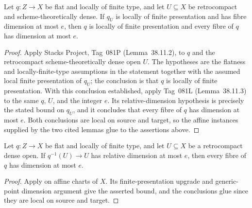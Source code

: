 \begin{lemma}
  \label{lemma:nagata-dense-open-dimension-package}

  Let $q\colon Z\to X$ be flat and locally of finite type, and let $U\subseteq X$
  be retrocompact and scheme-theoretically dense.  If $q_U$ is locally of
  finite presentation and has fibre dimension at most $e$, then $q$ is locally
  of finite presentation and every fibre of $q$ has dimension at most $e$.
\end{lemma}

\begin{proof}
  Apply Stacks Project, Tag~081P (Lemma~38.11.2), to $q$ and the
  retrocompact scheme-theoretically dense open $U$.  The hypotheses are the
  flatness and locally-finite-type assumptions in the statement together with
  the assumed local finite presentation of $q_U$; the conclusion is that $q$
  is locally of finite presentation.  With this conclusion established,
  apply Tag~081L (Lemma~38.11.3) to the same $q$, $U$, and the integer $e$.
  Its relative-dimension hypothesis is precisely the stated bound on
  $q_U$, and it concludes that every fibre of $q$ has dimension at most $e$.
  Both conclusions are local on source and target, so the affine instances
  supplied by the two cited lemmas glue to the assertions above.
\end{proof}

\begin{lemma}
  \label{lemma:nagata-flat-dense-open-relative-dimension}

  Let $q\colon Z\to X$ be flat and locally of finite type, and let
  $U\subseteq X$ be a retrocompact dense open.  If $q^{-1}(U)\to U$ has
  relative dimension at most $e$, then every fibre of $q$ has dimension at
  most $e$.
\end{lemma}

\begin{proof}
  Apply  on affine charts of
  $X$.  Its finite-presentation upgrade and generic-point dimension argument
  give the asserted bound, and the conclusions glue since they are local on
  source and target.
\end{proof}

